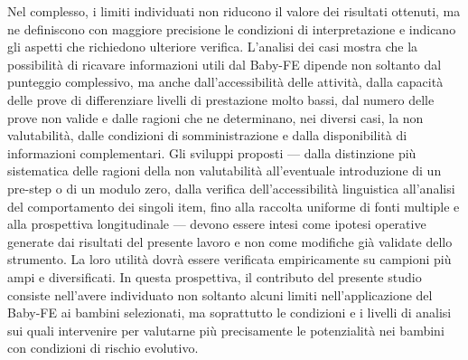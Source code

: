 Nel complesso, i limiti individuati non riducono il valore dei risultati ottenuti, ma ne definiscono con maggiore precisione le condizioni di interpretazione e indicano gli aspetti che richiedono ulteriore verifica. L'analisi dei casi mostra che la possibilità di ricavare informazioni utili dal Baby-FE dipende non soltanto dal punteggio complessivo, ma anche dall'accessibilità delle attività, dalla capacità delle prove di differenziare livelli di prestazione molto bassi, dal numero delle prove non valide e dalle ragioni che ne determinano, nei diversi casi, la non valutabilità, dalle condizioni di somministrazione e dalla disponibilità di informazioni complementari. Gli sviluppi proposti --- dalla distinzione più sistematica delle ragioni della non valutabilità all'eventuale introduzione di un pre-step o di un modulo zero, dalla verifica dell'accessibilità linguistica all'analisi del comportamento dei singoli item, fino alla raccolta uniforme di fonti multiple e alla prospettiva longitudinale --- devono essere intesi come ipotesi operative generate dai risultati del presente lavoro e non come modifiche già validate dello strumento. La loro utilità dovrà essere verificata empiricamente su campioni più ampi e diversificati. In questa prospettiva, il contributo del presente studio consiste nell'avere individuato non soltanto alcuni limiti nell'applicazione del Baby-FE ai bambini selezionati, ma soprattutto le condizioni e i livelli di analisi sui quali intervenire per valutarne più precisamente le potenzialità nei bambini con condizioni di rischio evolutivo.

\FloatBarrier

